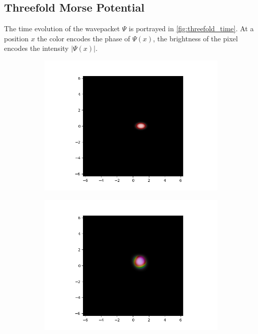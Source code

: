 \documentclass[11pt, a4paper, oneside]{article}
\begin{document}
\begin{appendices}
\subsection{Threefold Morse Potential}
The time evolution of the wavepacket $\Psi$ is portrayed in \cref{fig:threefold_time}. At a position $x$ the color encodes the phase of $\Psi(x)$, the brightness of the pixel encodes the intensity $\lvert \Psi(x) \rvert$.
\begin{figure}[h]
  \begin{subfigure}[b]{0.5 \textwidth}
    \includegraphics[width = \textwidth]{graphics/threefold_morse/wavefunction_contour_block_0_level_0_timestep_0000000.PNG}
  \end{subfigure}
  \begin{subfigure}[b]{0.5 \textwidth}
    \includegraphics[width = \textwidth]{graphics/threefold_morse/wavefunction_contour_block_0_level_0_timestep_0000100.PNG}

\end{subfigure}
\end{figure}
\end{appendices}
\end{document}
